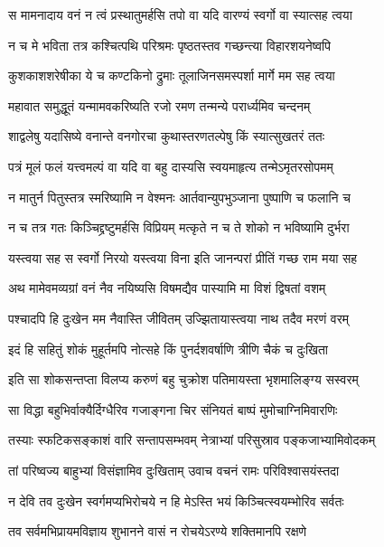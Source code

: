 \twolineshloka
{स मामनादाय वनं न त्वं प्रस्थातुमर्हसि}
{तपो वा यदि वारण्यं स्वर्गो वा स्यात्सह त्वया} %

\twolineshloka
{न च मे भविता तत्र कश्चित्पथि परिश्रमः}
{पृष्ठतस्तव गच्छन्त्या विहारशयनेष्वपि} %

\twolineshloka
{कुशकाशशरेषीका ये च कण्टकिनो द्रुमाः}
{तूलाजिनसमस्पर्शा मार्गे मम सह त्वया} %

\twolineshloka
{महावात समुद्धूतं यन्मामवकरिष्यति}
{रजो रमण तन्मन्ये परार्ध्यमिव चन्दनम्} %

\twolineshloka
{शाद्वलेषु यदासिष्ये वनान्ते वनगोरचा}
{कुथास्तरणतल्पेषु किं स्यात्सुखतरं ततः} %

\twolineshloka
{पत्रं मूलं फलं यत्त्वमल्पं वा यदि वा बहु}
{दास्यसि स्वयमाहृत्य तन्मेऽमृतरसोपमम्} %

\twolineshloka
{न मातुर्न पितुस्तत्र स्मरिष्यामि न वेश्मनः}
{आर्तवान्युपभुञ्जाना पुष्पाणि च फलानि च} %

\twolineshloka
{न च तत्र गतः किञ्चिद्द्रष्टुमर्हसि विप्रियम्}
{मत्कृते न च ते शोको न भविष्यामि दुर्भरा} %

\twolineshloka
{यस्त्वया सह स स्वर्गो निरयो यस्त्वया विना}
{इति जानन्परां प्रीतिं गच्छ राम मया सह} %

\twolineshloka
{अथ मामेवमव्यग्रां वनं नैव नयिष्यसि}
{विषमद्यैव पास्यामि मा विशं द्विषतां वशम्} %

\twolineshloka
{पश्चादपि हि दुःखेन मम नैवास्ति जीवितम्}
{उज्झितायास्त्वया नाथ तदैव मरणं वरम्} %

\twolineshloka
{इदं हि सहितुं शोकं मुहूर्तमपि नोत्सहे}
{किं पुनर्दशवर्षाणि त्रीणि चैकं च दुःखिता} %

\twolineshloka
{इति सा शोकसन्तप्ता विलप्य करुणं बहु}
{चुक्रोश पतिमायस्ता भृशमालिङ्ग्य सस्वरम्} %

\twolineshloka
{सा विद्धा बहुभिर्वाक्यैर्दिग्धैरिव गजाङ्गना}
{चिर संनियतं बाष्पं मुमोचाग्निमिवारणिः} %

\twolineshloka
{तस्याः स्फटिकसङ्काशं वारि सन्तापसम्भवम्}
{नेत्राभ्यां परिसुस्राव पङ्कजाभ्यामिवोदकम्} %

\twolineshloka
{तां परिष्वज्य बाहुभ्यां विसंज्ञामिव दुःखिताम्}
{उवाच वचनं रामः परिविश्वासयंस्तदा} %

\twolineshloka
{न देवि तव दुःखेन स्वर्गमप्यभिरोचये}
{न हि मेऽस्ति भयं किञ्चित्स्वयम्भोरिव सर्वतः} %

\twolineshloka
{तव सर्वमभिप्रायमविज्ञाय शुभानने}
{वासं न रोचयेऽरण्ये शक्तिमानपि रक्षणे} %

